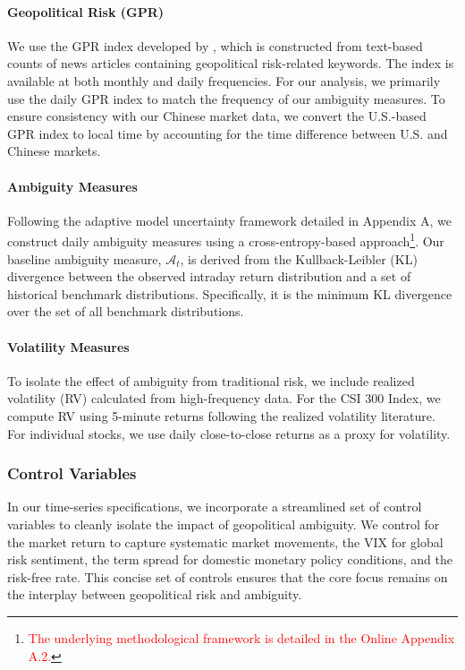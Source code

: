 \documentclass[preprint,12pt,authoryear]{elsarticle}
\begin{document}
\paragraph{Geopolitical Risk (GPR)}
We use the GPR index developed by \citet{Caldara2022}, which is constructed from text-based counts of news articles containing geopolitical risk-related keywords. The index is available at both monthly and daily frequencies. For our analysis, we primarily use the daily GPR index to match the frequency of our ambiguity measures. To ensure consistency with our Chinese market data, we convert the U.S.-based GPR index to local time by accounting for the time difference between U.S. and Chinese markets.

\paragraph{Ambiguity Measures}
Following the adaptive model uncertainty framework detailed in Appendix A, we construct daily ambiguity measures using a cross-entropy-based approach\footnote{\textcolor{red}{The underlying methodological framework is detailed in the Online Appendix A.2.}}. Our baseline ambiguity measure, $\mathcal{A}_t$, is derived from the Kullback-Leibler (KL) divergence between the observed intraday return distribution and a set of historical benchmark distributions. Specifically, it is the minimum KL divergence over the set of all benchmark distributions.


\paragraph{Volatility Measures}
To isolate the effect of ambiguity from traditional risk, we include realized volatility (RV) calculated from high-frequency data. For the CSI 300 Index, we compute RV using 5-minute returns following the realized volatility literature. For individual stocks, we use daily close-to-close returns as a proxy for volatility.

\subsubsection{Control Variables}

In our time-series specifications, we incorporate a streamlined set of control variables to cleanly isolate the impact of geopolitical ambiguity. We control for the market return to capture systematic market movements, the VIX for global risk sentiment, the term spread for domestic monetary policy conditions, and the risk-free rate. This concise set of controls ensures that the core focus remains on the interplay between geopolitical risk and ambiguity.
\end{document}
